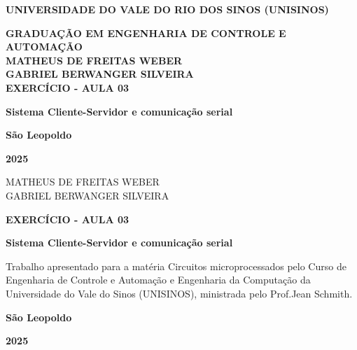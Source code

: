 \documentclass[12pt, a4paper]{article}
\date{\today}
\newcommand\studentName{Matheus de Freitas Weber}
\newcommand\studentTwoName{Gabriel Berwanger Silveira}
\newcommand\courseName{Circuitos microprocessados}
\newcommand\titleName{Exercício - Aula 03}
\newcommand\subTitleName{Sistema Cliente-Servidor e comunicação serial}
\newcommand\teacherName{Jean Schmith}
\begin{document}
\begin{center}
	\MakeUppercase{\textbf{Universidade do Vale do Rio dos Sinos (Unisinos)}}

	\MakeUppercase{\textbf{Graduação em Engenharia de controle e automação}} \\[16ex]


	\MakeUppercase{\textbf{\studentName}}
	\\
	\MakeUppercase{\textbf{\studentTwoName}}
	\\[16ex]

	\MakeUppercase{\textbf{\titleName}}

	\textbf{\subTitleName}

	\vfill

	\textbf{São Leopoldo}

	\textbf{2025}

	\thispagestyle{empty}
\end{center}
\newpage

\begin{center}
	\vspace*{28ex}
	\MakeUppercase{\studentName}
	\\
	\MakeUppercase{\studentTwoName}
	\vspace*{16ex}

	\MakeUppercase{\textbf{\titleName}}

	\textbf{\subTitleName}

	\vspace*{8ex}

	\hfill\begin{minipage}{0.5\linewidth}
		Trabalho apresentado para a matéria {\courseName} pelo Curso de Engenharia de Controle e Automação e Engenharia da Computação da Universidade do Vale do Sinos (UNISINOS), ministrada pelo Prof.\teacherName.
	\end{minipage}
	\vfill

	\textbf{São Leopoldo}

	\textbf{2025}

\end{center}
\thispagestyle{empty}
\setcounter{page}{1}

\newpage
\begin{center}
	\tableofcontents
\end{center}
\thispagestyle{empty}

\newpage
\end{document}
